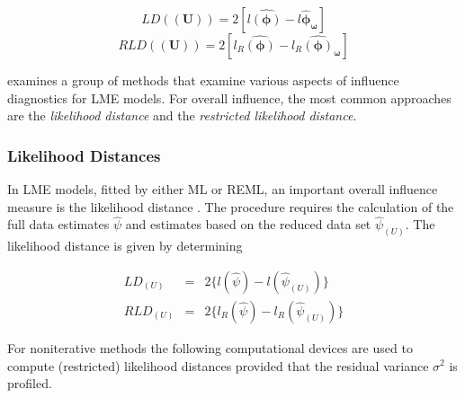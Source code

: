 \documentclass[12pt, a4paper]{report}
\theoremstyle{plain}
\theoremstyle{definition}
\theoremstyle{remark}
\begin{document}
	
	\[  LD(\boldsymbol{(U)})= 2[l\boldsymbol{\hat{(\phi)}} - l\boldsymbol{\hat{\phi}_\omega} ] \]
	\[  RLD(\boldsymbol{(U)})= 2[ l_R\boldsymbol{\hat{(\phi)}} - l_R\boldsymbol{\hat{(\phi)}_\omega} ] \]
	
	\citet{west} examines a group of methods that examine various aspects of influence diagnostics for LME models.
	For overall influence, the most common approaches are the \textit{likelihood distance} and the \textit{restricted likelihood distance}.
	
	
	
	
	
	

	
	
	
	\subsubsection{Likelihood Distances}

	
	
	In LME models, fitted by either ML or REML, an important overall
	influence measure is the likelihood distance \citep{cook82}. The
	procedure requires the calculation of the full data estimates
	$\hat{\psi}$ and estimates based on the reduced data set
	$\hat{\psi}_{(U)}$. The likelihood distance is given by
	determining
	
	
	\begin{eqnarray}
	LD_{(U)} &=& 2\{l(\hat{\psi}) - l( \hat{\psi}_{(U)}) \}\\
	RLD_{(U)} &=& 2\{l_{R}(\hat{\psi}) - l_{R}(\hat{\psi}_{(U)})\}
	\end{eqnarray}
	
	
	
	
	For noniterative methods the following computational devices are used to compute (restricted) likelihood distances provided that the residual variance
	$\sigma^2$ is profiled.
	
\end{document}
